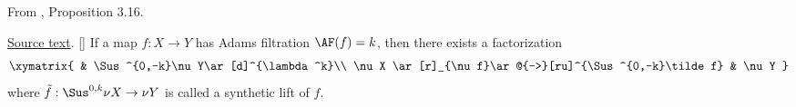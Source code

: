 \begin{proposition}
\label{paper:3.16}
From \cite{LWX126}, Proposition 3.16.\par

\href{paper/main.tex.html#L912}{Source text}.
[{\cite[Lemma 9.15]{BHS}}]\label{prop:ef21f9bc}
    If a map $f:X\to Y$ has Adams filtration $\AF(f)=k$, then there exists a factorization
    $$\xymatrix{
     & \Sus^{0,-k}\nu Y\ar[d]^{\lambda^k}\\
     \nu X \ar[r]_{\nu f}\ar@{-->}[ru]^{\Sus^{0,-k}\tilde f} & \nu Y
    }$$
    where $\tilde f: \Sus^{0,k}\nu X\to \nu Y$ is called a synthetic lift of $f$.



\end{proposition}
